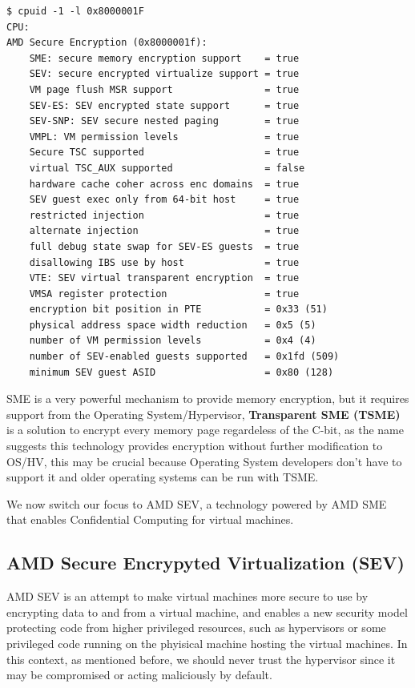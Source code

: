 \documentclass[twocolumn]{article}
\begin{document}
    \begin{verbatim}
$ cpuid -1 -l 0x8000001F
CPU:
AMD Secure Encryption (0x8000001f):
    SME: secure memory encryption support    = true
    SEV: secure encrypted virtualize support = true
    VM page flush MSR support                = true
    SEV-ES: SEV encrypted state support      = true
    SEV-SNP: SEV secure nested paging        = true
    VMPL: VM permission levels               = true
    Secure TSC supported                     = true
    virtual TSC_AUX supported                = false
    hardware cache coher across enc domains  = true
    SEV guest exec only from 64-bit host     = true
    restricted injection                     = true
    alternate injection                      = true
    full debug state swap for SEV-ES guests  = true
    disallowing IBS use by host              = true
    VTE: SEV virtual transparent encryption  = true
    VMSA register protection                 = true
    encryption bit position in PTE           = 0x33 (51)
    physical address space width reduction   = 0x5 (5)    
    number of VM permission levels           = 0x4 (4)
    number of SEV-enabled guests supported   = 0x1fd (509)
    minimum SEV guest ASID                   = 0x80 (128)
    \end{verbatim}
    
    SME is a very powerful mechanism to provide memory encryption, but it requires support from the Operating System/Hypervisor, \textbf{Transparent SME (TSME)} is a solution to encrypt every memory page regardeless of the C-bit, as the name suggests this technology provides encryption without further modification to OS/HV, this may be crucial because Operating System developers don't have to support it and older operating systems can be run with TSME.

    We now switch our focus to AMD SEV, a technology powered by AMD SME that enables Confidential Computing for virtual machines.

\subsection{AMD Secure Encrypyted Virtualization (SEV)}

    AMD SEV is an attempt to make virtual machines more secure to use by encrypting data to and from a virtual machine, and enables a new security model protecting code from higher privileged resources, such as hypervisors or some privileged code running on the phyisical machine hosting the virtual machines. In this context, as mentioned before, we should never trust the hypervisor since it may be compromised or acting maliciously by default.
\end{document}

